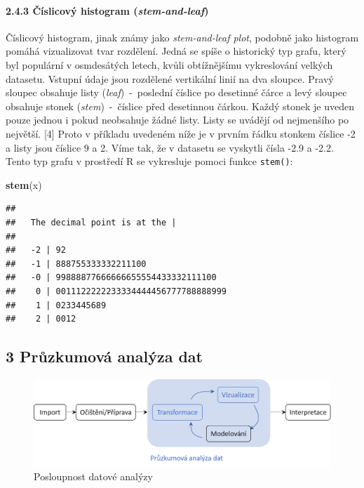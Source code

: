 \documentclass[12pt,]{article}
\newenvironment{Shaded}{\begin{snugshade}}{\end{snugshade}}
\newcommand{\KeywordTok}[1]{\textcolor[rgb]{0.13,0.29,0.53}{\textbf{#1}}}
\newcommand{\NormalTok}[1]{#1}
\let\oldparagraph\paragraph
\renewcommand{\paragraph}[1]{\oldparagraph{#1}\mbox{}}
\begin{document}
\hypertarget{stem-and-leaf}{\paragraph{\texorpdfstring{2.4.3 Číslicový
histogram
(\emph{stem-and-leaf})}{2.4.3 Číslicový histogram (stem-and-leaf)}}\label{stem-and-leaf}}

\qquad Číslicový histogram, jinak známy jako \emph{stem-and-leaf plot},
podobně jako histogram pomáhá vizualizovat tvar rozdělení. Jedná se
spíše o historický typ grafu, který byl populární v osmdesátých letech,
kvůli obtížnějšímu vykreslování velkých datasetu. Vstupní údaje jsou
rozdělené vertikální linií na dva sloupce. Pravý sloupec obsahuje listy
(\emph{leaf})~-~poslední číslice po desetinné čárce a levý sloupec
obsahuje stonek (\emph{stem})~-~číslice před desetinnou čárkou. Každý
stonek je uveden pouze jednou i pokud neobsahuje žádné listy. Listy se
uvádějí od nejmenšího po největší. {[}4{]} Proto v příkladu uvedeném
níže je v prvním řádku stonkem číslice -2 a listy jsou číslice 9 a 2.
Víme tak, že v datasetu se vyskytli čísla -2.9 a -2.2. Tento typ grafu v
prostředí R se vykresluje pomoci funkce \texttt{stem()}:

\begin{Shaded}
\begin{Highlighting}[]
\KeywordTok{stem}\NormalTok{(x)}
\end{Highlighting}
\end{Shaded}

\begin{verbatim}
## 
##   The decimal point is at the |
## 
##   -2 | 92
##   -1 | 888755333332211100
##   -0 | 99888877666666655554433332111100
##    0 | 0011122222233334444456777788888999
##    1 | 0233445689
##    2 | 0012
\end{verbatim}

\newpage

\hypertarget{EDA}{\subsection{3 Průzkumová analýza dat}\label{EDA}}

\begin{figure}[H]

{\centering \includegraphics[width=1\linewidth]{fig/EDA_diagram2} 

}

\caption{\label{fig9} Posloupnost datové analýzy}\label{fig:diagram_img}
\end{figure}
\end{document}

